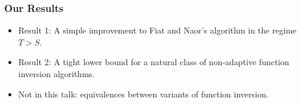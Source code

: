 \documentclass[usenames, dvipsnames, t, table]{beamer}
\newcommand{\inlineauthor}[1]{\raisebox{-0.5 \height}{\texttt{[image: assets/\#1]}}}
\begin{document}
\begin{frame}

  \end{frame}

  \begin{frame}
    \frametitle{Our Results}
     \begin{itemize}
     \item Result 1: A simple improvement \newline
       to Fiat and Naor's algorithm in the regime $T > S$.
    \item Result 2: A tight lower bound for a natural class of non-adaptive function inversion algorithms.
    \item Not in this talk: equivalences between variants of function inversion.
    \end{itemize}
  \end{frame}
\end{document}

